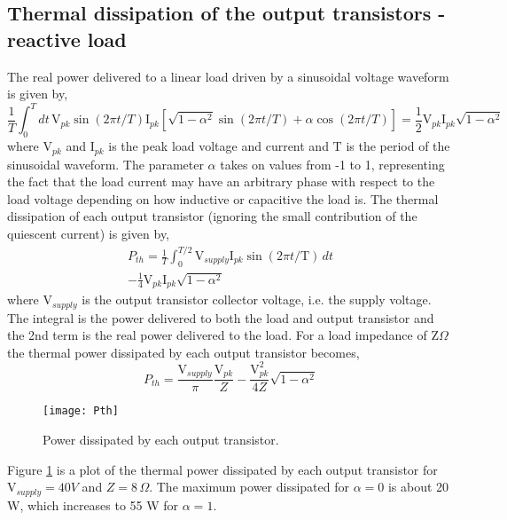 \documentclass[a4paper,10pt, oneside]{article}
\begin{document}
\subsection*{Thermal dissipation of the output transistors - reactive load}
The real power delivered to a linear load driven by a sinusoidal voltage waveform is given by,
\begin{equation}
\frac{1}{T}\int_{0}^{T}dt\,\textrm{V}_{pk}\sin(2\pi t/T)\textrm{I}_{pk}\left[\sqrt{1-\alpha^{2}}\sin(2\pi t/T)+\alpha\cos(2\pi t/T)\right] = \frac{1}{2}\textrm{V}_{pk}\textrm{I}_{pk}\sqrt{1-\alpha^{2}}
\end{equation}
where $\textrm{V}_{pk}$ and $\textrm{I}_{pk}$ is the peak load voltage and current and $\textrm{T}$ is the period of the sinusoidal waveform.
The parameter $\alpha$ takes on values from -1 to 1, representing the fact that the load current may have an arbitrary phase with respect to the load voltage depending on how inductive or capacitive the load is. 
The thermal dissipation of each output transistor (ignoring the small contribution of the quiescent current) is given by,
\begin{eqnarray}
P_{th} = \frac{1}{T}\int_{0}^{T/2} \textrm{V}_{supply}\textrm{I}_{pk}\sin(2\pi t/\textrm{T})\,dt\\
-\frac{1}{4}\textrm{V}_{pk}\textrm{I}_{pk}\sqrt{1-\alpha^{2}}
\end{eqnarray}
where $\textrm{V}_{supply}$ is the output transistor collector voltage, i.e. the supply voltage. The integral is the power delivered 
to both the load and output transistor and the 2nd term is the real power delivered to the load. For a load impedance of Z$\Omega$ the 
thermal power dissipated by each output transistor becomes,
\begin{equation}
P_{th} = \frac{\textrm{V}_{supply}}{\pi}\frac{\textrm{V}_{pk}}{Z} - \frac{\textrm{V}^{2}_{pk}}{4Z}\sqrt{1-\alpha^{2}}
\end{equation}
\begin{figure}[H]
	\texttt{[image: Pth]}
	\caption{Power dissipated by each output transistor.}\label{Pth}
\end{figure}
Figure \ref{Pth} is a plot of the thermal power dissipated by each output transistor for $\textrm{V}_{supply} = 40V$ and $Z=8\,\Omega$. The 
maximum power dissipated for $\alpha=0$ is about 20 W, which increases to 55 W for $\alpha=1$. 
\end{document}
